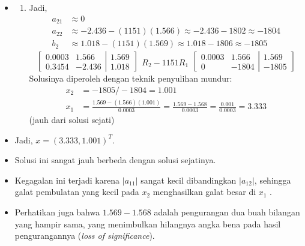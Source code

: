 \documentclass[pdflatex,compress,mathserif]{beamer}
\begin{document}
\begin{frame}
	\begin{itemize}
		\item[]
		\begin{enumerate}
			\item[] Jadi,
			\begin{align*}
				a_{21} &\approx 0 \\
				a_{22} &\approx -2.436 - (1151)(1.566) \approx -2.436 - 1802 \approx -1804 \\
				b_2 &\approx 1.018 - (1151)(1.569) \approx 1.018 - 1806 \approx -1805
			\end{align*}
			\[
			\left[
				\begin{matrix}
					0.0003 & 1.566 \\
					0.3454 & -2.436
				\end{matrix}
			\right|
			\left.
				\begin{matrix}
					1.569 \\ 1.018
				\end{matrix}
			\right]
			\begin{matrix}
				\\
				R_2 -1151R_1
			\end{matrix}
			\left[
				\begin{matrix}
					0.0003 & 1.566 \\
					0 & -1804
				\end{matrix}
			\right|
			\left.
				\begin{matrix}
					1.569 \\ -1805
				\end{matrix}
			\right]
			\]
			Solusinya diperoleh dengan teknik penyulihan mundur:
			\begin{align*}
				x_2 &= -1805/-1804 = 1.001 \\
				x_1 &= \frac{1.569 - ( 1.566 )( 1.001 )}{0.0003} = \frac{1.569 - 1.568}{0.0003} = \frac{0.001}{0.0003} = 3.333
			\end{align*}
			(jauh dari solusi sejati)
		\end{enumerate}
	\end{itemize}
\end{frame}

\begin{frame}
	\begin{itemize}
		\item Jadi, $ x = (3.333, 1.001)^T $.
		\item Solusi ini sangat jauh berbeda dengan solusi sejatinya.
		\item Kegagalan ini terjadi karena $ | a_{11} | $ sangat kecil dibandingkan $ |a_{12} | $, sehingga galat pembulatan yang kecil pada $ x_2 $ menghasilkan galat besar di $ x_1 $ .
		\item Perhatikan juga bahwa $ 1.569 - 1.568 $ adalah pengurangan dua buah bilangan yang hampir sama, yang menimbulkan hilangnya angka bena pada hasil pengurangannya (\textit{loss of significance}).
	\end{itemize}
\end{frame}
\end{document}

